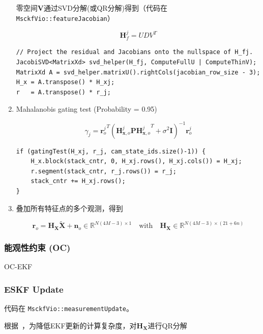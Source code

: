 \documentclass[12pt,a4paper]{article}
\begin{document}
\begin{enumerate}
零空间$\mathbf{V}$通过SVD分解(或QR分解)得到（代码在 \verb|MsckfVio::featureJacobian|）

$$
\mathbf{H}_f^j = UDV^T
$$

\begin{lstlisting}
// Project the residual and Jacobians onto the nullspace of H_fj.
JacobiSVD<MatrixXd> svd_helper(H_fj, ComputeFullU | ComputeThinV);
MatrixXd A = svd_helper.matrixU().rightCols(jacobian_row_size - 3);
H_x = A.transpose() * H_xj;
r   = A.transpose() * r_j;
\end{lstlisting}

\item Mahalanobis gating test (Probability = 0.95)

$$
{\gamma}_j = 
{\mathbf{r}^j_o }^T 
(\mathbf{H}_{\mathbf{x}, o}^j \mathbf{P} {\mathbf{H}_{\mathbf{x}, o}^j}^T + 
{\sigma}^2 \mathbf{I})^{-1} 
\mathbf{r}^j_o 
$$

\begin{lstlisting}
if (gatingTest(H_xj, r_j, cam_state_ids.size()-1)) {
	H_x.block(stack_cntr, 0, H_xj.rows(), H_xj.cols()) = H_xj;
	r.segment(stack_cntr, r_j.rows()) = r_j;
	stack_cntr += H_xj.rows();
}
\end{lstlisting}

\item 叠加所有特征点的多个观测，得到

\begin{equation}
\label{equ:visual_residual_final}
\mathbf{r}_{o}=\mathbf{H}_{\mathbf{X}} \widetilde{\mathbf{X}}+\mathbf{n}_{o}
\in \mathbb{R}^{N(4M-3) \times 1}
\quad \text{with} \quad
\mathbf{H}_{\mathbf{X}} \in \mathbb{R}^{N(4M-3) \times (21+6n)}
\end{equation}


\end{enumerate}


\subsubsection{能观性约束 (OC)}

OC-EKF


\subsubsection{ESKF Update}

代码在 \verb|MsckfVio::measurementUpdate|。

根据~\cite{mourikis2007multi}，为降低EKF更新的计算复杂度，对$\mathbf{H}_{\mathbf{X}}$进行QR分解
\end{document}
